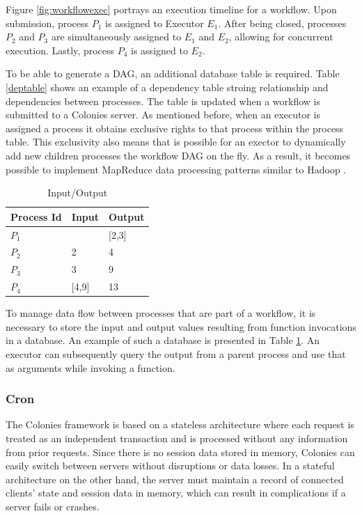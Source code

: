 \documentclass{article}
\begin{document}
Figure \ref{fig:workflowexec} portrays an execution timeline for a workflow. Upon submission, process \(P_{1}\) is assigned to Executor \(E_{1}\). After being closed, processes \(P_{2}\) and \(P_{3}\) are simultaneously assigned to \(E_{1}\) and \(E_{2}\), allowing for concurrent execution. Lastly, process \(P_{4}\) is assigned to \(E_{2}\).  

To be able to generate a DAG, an additional database table is required. Table \ref{deptable} shows an example of a dependency table stroing relationship and dependencies between processes. The table is updated when a workflow is submitted to a Colonies server. As mentioned before, when an executor is assigned a process it obtains exclusive rights to that process within the process table. This exclusivity also means that is possible for an exector to dynamically add new children processes the workflow DAG on the fly. As a result, it becomes possible to implement MapReduce \cite{mapreduce} data processing patterns similar to Hadoop \cite{hadoop}.  

\begin{table}[h]
	\caption{Input/Output}
	\centering
	\begin{tabular}{lll}
		\toprule
		\cmidrule(r){1-2}
        Process Id & Input & Output \\
		\midrule
        $P_{1}$    & & [2,3] \\
        $P_{2}$    & 2 & 4 \\
        $P_{3}$    & 3 & 9 \\
        $P_{4}$    & [4,9] & 13 \\
		\bottomrule
	\end{tabular}
	\label{inouttable}
\end{table}

To manage data flow between processes that are part of a workflow, it is necessary to store the input and output values resulting from function invocations in a database. An example of such a database is presented in Table \ref{inouttable}. An executor can subsequently query the output from a parent process and use that as arguments while invoking a function.

\subsubsection{Cron}
The Colonies framework is based on a stateless architecture where each request is treated as an independent transaction and is processed without any information from prior requests. Since there is no session data stored in memory, Colonies can easily switch between servers without disruptions or data losses. In a stateful architecture on the other hand, the server must maintain a record of connected clients' state and session data in memory, which can result in complications if a server fails or crashes. 
\end{document}
